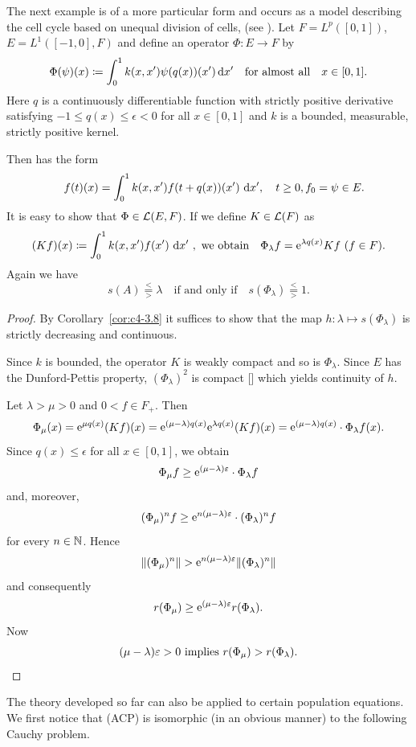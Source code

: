 \begin{example}\label{ex:c4-3.11}
The next example is of a more particular form and occurs as a model describing the cell cycle based on unequal division of cells, (see  \textcite{arinokimmel:1985}).
Let $F = L^{p}([0,1])$,\, $E = L^{1}([-1,0], F)$ and define an operator $\Phi \colon E \to F$ by
\[
\Phi(\psi)(x) \coloneqq \int_0^1 k(x,x')\psi(q(x))(x') \mathop{}\!\mathrm{d}{x}' \quad \text{for almost all} \quad x \in [0,1].
\]
Here $q$ is a continuously differentiable function with strictly positive derivative satisfying $-1 \leq q(x) \leq \epsilon < 0$ for all $x \in [0,1]$ and $k$ is a bounded, measurable, strictly positive kernel.

Then  has the form
\begin{equation} \label{eq:c4-3.12}
\quad f(t)(x) = \int_{0}^{1} k(x,x')f(t+q(x))(x') \, \dx', \quad t \geq 0, f_{0} = \psi \in E.
\end{equation}
It is easy to show that $\Phi \in \mathcal{L}(E,F)$.
If we define $K \in \mathcal{L}(F)$  as 
\[
(Kf)(x) \coloneqq \int_{0}^{1} k(x,x')f(x') \, \mathop{}\!\mathrm{d}{x}' \ ,
\ \text{we obtain} \quad 
\Phi_{\lambda}f = \mathrm{e}^{\lambda q(x)}Kf \,\, (f \in F) .
\]
Again we have 
\begin{equation*}\label{eq:c4-3.12-kgk1}
s(A) \overset{<}{ \underset{>}{=} }\lambda \quad \text{if and only if} \quad s(\Phi_{\lambda}) \overset{<}{ \underset{>}{=} } 1  .
\end{equation*}
\end{example}
\begin{proof}
By Corollary~\ref{cor:c4-3.8} it suffices to show that the map $h \colon \lambda \mapsto s(\Phi_{\lambda})$ is strictly decreasing and continuous.

Since $k$ is bounded, the operator $K$ is weakly compact and so is $\Phi_{\lambda}$.
Since $E$ has the Dunford-Pettis property, $(\Phi_{\lambda})^{2}$ is compact [\textcite[Theorem II.9.9]{schaefer:1974}] which yields continuity of\/ $h$.

Let $\lambda > \mu > 0$ and $0 < f \in F_{+}$.
Then 
\[
\Phi_{\mu}(x) = 
\mathrm{e}^{\mu q(x)}(Kf)(x) = 
\mathrm{e}^{(\mu-\lambda)q(x)}\mathrm{e}^{\lambda q(x)}(Kf)(x) =
\mathrm{e}^{(\mu-\lambda)q(x)} \cdot \Phi_{\lambda}f(x) .
\]
Since $q(x) \leq \epsilon$ for all $x \in [0,1]$, we obtain 
\[
\Phi_{\mu}f \geq \eu^{(\mu-\lambda)\epsilon} \cdot \Phi_{\lambda}f
\]
and, moreover, 
\[
(\Phi_{\mu})^n f \geq \eu^{n(\mu-\lambda)\epsilon} \cdot (\Phi_{\lambda})^n f
\]
for every $n \in \mathbb{N}$.
Hence 
\[
\|(\Phi_{\mu})^n\| > \eu^{n(\mu-\lambda)\epsilon}\|(\Phi_{\lambda})^n\|
\]
and consequently 
\[
r(\Phi_{\mu}) \geq \eu^{(\mu-\lambda)\epsilon}r(\Phi_{\lambda}) .
\]
Now 
\[
\text{$(\mu-\lambda)\epsilon > 0$ implies 
$r(\Phi_{\mu}) > r(\Phi_{\lambda})$.}
\qedhere
\]
\end{proof}
The theory developed so far can also be applied to certain population equations.
We first notice that (ACP) is isomorphic (in an obvious manner) to the following Cauchy problem.

